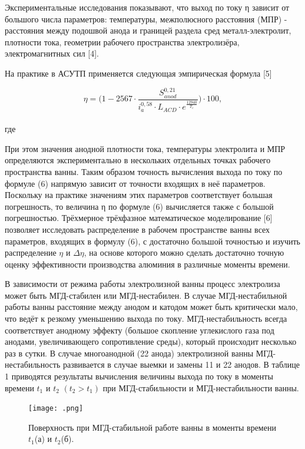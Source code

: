 \documentclass{article}
\begin{document}
Экспериментальные исследования показывают, что выход по току η зависит от большого числа параметров: температуры, межполюсного расстояния (МПР) - расстояния между подошвой анода и границей раздела сред металл-электролит, плотности тока, геометрии рабочего пространства электролизёра, электромагнитных сил [4].

На практике в АСУТП применяется следующая эмпирическая формула [5] 

\[ \eta = \bigg(1-2567 \cdot \frac{S^{0,21}_{anod}}{i^{0,58}_{a}\cdot L_{ACD} \cdot e^{\frac{12940}{T_e}}}\bigg) \cdot 100, \]
\\
где 

При этом значения анодной плотности тока, температуры электролита и МПР определяются экспериментально в нескольких отдельных точках рабочего пространства ванны.
Таким образом точность вычисления выхода по току по формуле (6) напрямую зависит от точности входящих в неё параметров. Поскольку на практике значениям этих параметров соответствует большая погрешность, то величина η по формуле (6) вычисляется также с большой погрешностью. Трёхмерное трёхфазное математическое моделирование [6] позволяет исследовать распределение в рабочем пространстве ванны всех параметров, входящих в формулу (6), с достаточно большой точностью и изучить распределение $\eta$ и $\Delta\eta$, на основе которого можно сделать достаточно точную оценку эффективности производства алюминия в различные моменты времени.

В зависимости от режима работы электролизной ванны процесс электролиза может быть МГД-стабилен или МГД-нестабилен. В случае МГД-нестабильной работы ванны расстояние между анодом и катодом может быть критически мало, что ведёт к резкому уменьшению выхода по току. МГД-нестабильность всегда соответствует анодному эффекту (большое скопление углекислого газа под анодами, увеличивающего сопротивление среды), который происходит несколько раз в сутки. В случае многоанодной (22 анода) электролизной ванны МГД-нестабильность развивается в случае выемки и замены 11 и 22 анодов. В таблице 1 приводятся результаты вычисления величины выхода по току в моменты времени $t_1$ и $t_2$ $(t_2>t_1)$ при МГД-стабильности и МГД-нестабильности ванны. 


\begin{figure}[h!]
    \centering
    \texttt{[image: .png]}
    \caption{Поверхность при МГД-стабильной работе ванны в моменты времени $t_1$(а) и $t_2$(б).}
    \label{fig:} 
\end{figure}
\end{document}
